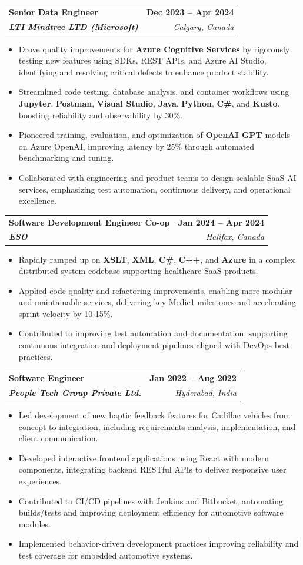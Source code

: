 \documentclass[letterpaper,11pt]{article}
\makeatletter
\newcommand{\resumeItem}[1]{
  \item\small{
    {#1 \vspace{-2pt}}
  }
}
\newcommand{\resumeSubheading}[4]{
  \vspace{-2pt}\item
    \begin{tabular*}{1.0\textwidth}[t]{l@{\extracolsep{\fill}}r}
      \textbf{#1} & \textbf{\small #2} \\
      \textit{\small#3} & \textit{\small #4} \\
    \end{tabular*}\vspace{-7pt}
}
\newcommand{\resumeItemListStart}{\begin{itemize}}
\newcommand{\resumeItemListEnd}{\end{itemize}\vspace{-5pt}}
\makeatother
\begin{document}
    \resumeSubheading
      {\textbf{Senior Data Engineer}}{\textbf{Dec 2023 -- Apr 2024}}
      {\textbf{LTI Mindtree LTD (Microsoft)}}{Calgary, Canada}
      \resumeItemListStart
        \resumeItem{Drove quality improvements for \textbf{Azure Cognitive Services} by rigorously testing new features using SDKs, REST APIs, and Azure AI Studio, identifying and resolving critical defects to enhance product stability.}
        \resumeItem{Streamlined code testing, database analysis, and container workflows using \textbf{Jupyter}, \textbf{Postman}, \textbf{Visual Studio}, \textbf{Java}, \textbf{Python}, \textbf{C\#}, and \textbf{Kusto}, boosting reliability and observability by 30\%.}
        \resumeItem{Pioneered training, evaluation, and optimization of \textbf{OpenAI GPT} models on Azure OpenAI, improving latency by 25\% through automated benchmarking and tuning.}
        \resumeItem{Collaborated with engineering and product teams to design scalable SaaS AI services, emphasizing test automation, continuous delivery, and operational excellence.}
      \resumeItemListEnd
    
    \resumeSubheading
      {\textbf{Software Development Engineer Co-op}}{\textbf{Jan 2024 -- Apr 2024}}
      {\textbf{ESO}}{Halifax, Canada}
      \resumeItemListStart
        \resumeItem{Rapidly ramped up on \textbf{XSLT}, \textbf{XML}, \textbf{C\#}, \textbf{C++}, and \textbf{Azure} in a complex distributed system codebase supporting healthcare SaaS products.}
        \resumeItem{Applied code quality and refactoring improvements, enabling more modular and maintainable services, delivering key Medic1 milestones and accelerating sprint velocity by 10-15\%.}
        \resumeItem{Contributed to improving test automation and documentation, supporting continuous integration and deployment pipelines aligned with DevOps best practices.}
      \resumeItemListEnd

    \resumeSubheading
      {\textbf{Software Engineer}}{\textbf{Jan 2022 -- Aug 2022}}
      {\textbf{People Tech Group Private Ltd.}}{Hyderabad, India}
      \resumeItemListStart
        \resumeItem{Led development of new haptic feedback features for Cadillac vehicles from concept to integration, including requirements analysis, implementation, and client communication.}
        \resumeItem{Developed interactive frontend applications using React with modern components, integrating backend RESTful APIs to deliver responsive user experiences.}
        \resumeItem{Contributed to CI/CD pipelines with Jenkins and Bitbucket, automating builds/tests and improving deployment efficiency for automotive software modules.}
        \resumeItem{Implemented behavior-driven development practices improving reliability and test coverage for embedded automotive systems.}
      \resumeItemListEnd
\end{document}

